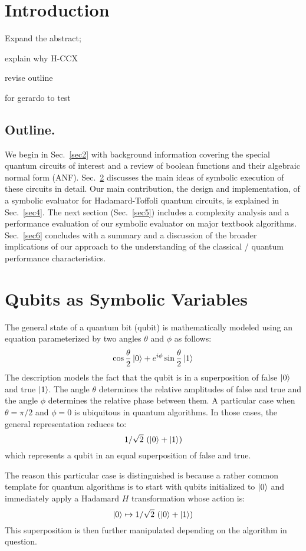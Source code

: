 \documentclass[sigplan,review]{acmart}
\theoremstyle{definition}
\begin{document}
\section{Introduction}

Expand the abstract;

explain why H-CCX

revise outline

for gerardo to test

\subsection*{Outline.}
We begin in Sec.~\ref{sec2} with background information covering the
special quantum circuits of interest and a review of boolean functions
and their algebraic normal form (ANF). Sec.~\ref{sec3} discusses the
main ideas of symbolic execution of these circuits in detail. Our main
contribution, the design and implementation, of a symbolic evaluator
for Hadamard-Toffoli quantum circuits, is explained in
Sec.~\ref{sec4}. The next section (Sec.~\ref{sec5}) includes a
complexity analysis and a performance evaluation of our symbolic
evaluator on major textbook algorithms. Sec.~\ref{sec6} concludes with
a summary and a discussion of the broader implications of our approach
to the understanding of the classical / quantum performance
characteristics. 


\section{Qubits as Symbolic Variables} 
\label{sec3}

The general state of a quantum bit (qubit) is mathematically modeled
using an equation parameterized by two angles $\theta$ and $\phi$ as
follows:
\[
\cos{\frac{\theta}{2}} \ket{0} + e^{i\phi} \sin{\frac{\theta}{2}} \ket{1} 
\]
The description models the fact that the qubit is in a superposition
of false $\ket{0}$ and true $\ket{1}$. The angle $\theta$
determines the relative amplitudes of false and true and the angle
$\phi$ determines the relative phase between them. A particular case
when $\theta = \pi/2$ and $\phi=0$ is ubiquitous in quantum
algorithms. In those cases, the general representation reduces to:
\[
1/\sqrt{2}~ (\ket{0} + \ket{1} )
\]
which represents a qubit in an equal superposition of false and
true.

The reason this particular case is distinguished is because a rather
common template for quantum algorithms is to start with qubits
initialized to $\ket{0}$ and immediately apply a Hadamard $H$ transformation
whose action is:
\[
  \ket{0} \mapsto 1/\sqrt{2} ~(\ket{0} + \ket{1})
\]
This superposition is then further manipulated depending on the
algorithm in question.
\end{document}
